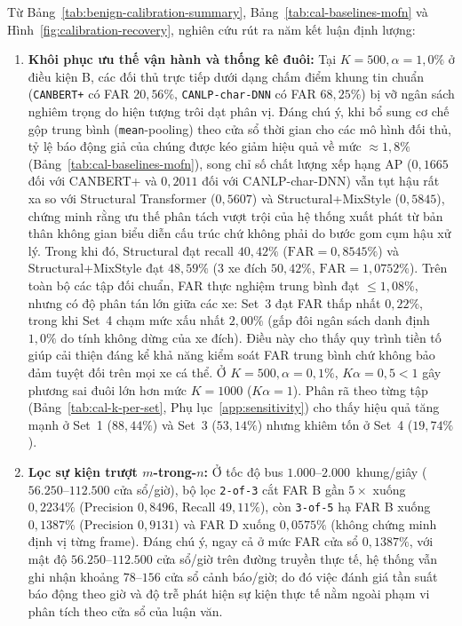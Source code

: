 \documentclass[12pt, a4paper, reqno, oneside]{book}
\DeclareRobustCommand{\code}[1]{\nolinkurl{#1}}
\begin{document}
Từ Bảng~\ref{tab:benign-calibration-summary}, Bảng~\ref{tab:cal-baselines-mofn} và Hình~\ref{fig:calibration-recovery}, nghiên cứu rút ra năm kết luận định lượng:
\begin{enumerate}
    \item \textbf{Khôi phục ưu thế vận hành và thống kê đuôi:} Tại $K=500, \alpha=1{,}0\%$ ở điều kiện B, các đối thủ trực tiếp dưới dạng chấm điểm khung tin chuẩn (\code{CANBERT+} có FAR $20{,}56\%$, \code{CANLP-char-DNN} có FAR $68{,}25\%$) bị vỡ ngân sách nghiêm trọng do hiện tượng trôi dạt phân vị. Đáng chú ý, khi bổ sung cơ chế gộp trung bình (\code{mean}-pooling) theo cửa sổ thời gian cho các mô hình đối thủ, tỷ lệ báo động giả của chúng được kéo giảm hiệu quả về mức $\approx 1{,}8\%$ (Bảng~\ref{tab:cal-baselines-mofn}), song chỉ số chất lượng xếp hạng AP ($0{,}1665$ đối với CANBERT+ và $0{,}2011$ đối với CANLP-char-DNN) vẫn tụt hậu rất xa so với Structural Transformer ($0{,}5607$) và Structural+MixStyle ($0{,}5845$), chứng minh rằng ưu thế phân tách vượt trội của hệ thống xuất phát từ bản thân không gian biểu diễn cấu trúc chứ không phải do bước gom cụm hậu xử lý. Trong khi đó, Structural đạt recall $40{,}42\%$ ($\text{FAR}=0{,}8545\%$) và Structural+MixStyle đạt $48{,}59\%$ (3 xe đích $50{,}42\%$, $\text{FAR}=1{,}0752\%$). Trên toàn bộ các tập đối chuẩn, FAR thực nghiệm trung bình đạt $\le 1{,}08\%$, nhưng có độ phân tán lớn giữa các xe: Set~3 đạt FAR thấp nhất $0{,}22\%$, trong khi Set~4 chạm mức xấu nhất $2{,}00\%$ (gấp đôi ngân sách danh định $1{,}0\%$ do tính không dừng của xe đích). Điều này cho thấy quy trình tiền tố giúp cải thiện đáng kể khả năng kiểm soát FAR trung bình chứ không bảo đảm tuyệt đối trên mọi xe cá thể. Ở $K=500, \alpha=0{,}1\%$, $K\alpha = 0{,}5 < 1$ gây phương sai đuôi lớn hơn mức $K=1000$ ($K\alpha = 1$). Phân rã theo từng tập (Bảng~\ref{tab:cal-k-per-set}, Phụ lục~\ref{app:sensitivity}) cho thấy hiệu quả tăng mạnh ở Set~1 ($88{,}44\%$) và Set~3 ($53{,}14\%$) nhưng khiêm tốn ở Set~4 ($19{,}74\%$).
    \item \textbf{Lọc sự kiện trượt $m$-trong-$n$:} Ở tốc độ bus $1.000$--$2.000$~khung/giây ($56.250$--$112.500$ cửa sổ/giờ), bộ lọc \code{2-of-3} cắt FAR B gần $5\times$ xuống $0{,}2234\%$ (Precision $0{,}8496$, Recall $49{,}11\%$), còn \code{3-of-5} hạ FAR B xuống $0{,}1387\%$ (Precision $0{,}9131$) và FAR D xuống $0{,}0575\%$ (không chứng minh định vị từng frame). Đáng chú ý, ngay cả ở mức FAR cửa sổ $0{,}1387\%$, với mật độ $56.250\text{--}112.500$ cửa sổ/giờ trên đường truyền thực tế, hệ thống vẫn ghi nhận khoảng $78\text{--}156$ cửa sổ cảnh báo/giờ; do đó việc đánh giá tần suất báo động theo giờ và độ trễ phát hiện sự kiện thực tế nằm ngoài phạm vi phân tích theo cửa sổ của luận văn.

\end{enumerate}
\end{document}
